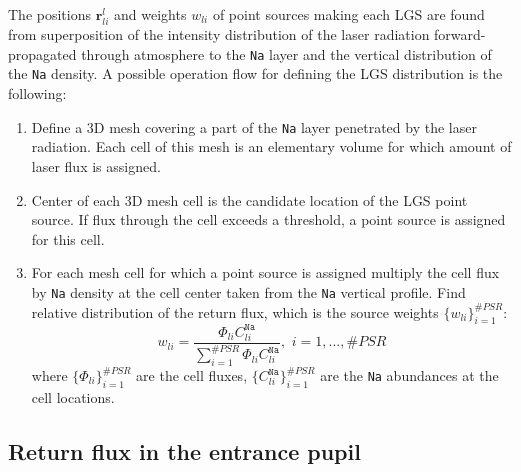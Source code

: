 The positions $\bm{r}^{l}_{li}$ and weights $w_{li}$ of point sources making
each LGS are found from superposition of the intensity distribution of the laser
radiation forward-propagated through atmosphere to the \texttt{Na} layer and
the vertical distribution of the \texttt{Na} density. A possible operation
flow for defining the LGS distribution is the following:
\begin{enumerate}
	\item Define a 3D mesh covering a part of the \texttt{Na} layer penetrated
	by the laser radiation. Each cell of this mesh is an elementary volume for
	which amount of laser flux is assigned.
	\item Center of each 3D mesh cell is the candidate location of the LGS point
	source. If flux through the cell exceeds a threshold, a point source is
	assigned for this cell.
	\item For each mesh cell for which a point source is assigned multiply the
	cell flux by \texttt{Na} density at the cell center taken from the
	\texttt{Na} vertical profile. Find relative distribution of the return flux,
	which is the source weights $\{ w_{li} \}_{i=1}^{\#PSR}$:
	\begin{equation} \label{eq:source-weights}
		w_{li} = \frac{ \Phi_{li} C^{\texttt{Na}}_{li} }
		               { \sum_{i=1}^{\#PSR} \Phi_{li} C^{\texttt{Na}}_{li} },
		           \,\, i = 1, ... , \#PSR
	\end{equation}
	where $\{ \Phi_{li} \}_{i=1}^{\#PSR}$ are the cell fluxes,
	$\{ C^{\texttt{Na}}_{li} \}_{i=1}^{\#PSR}$ are the \texttt{Na} abundances at
	the cell locations.
\end{enumerate}

\subsection{Return flux in the entrance pupil}
\label{sec:return-flux}

